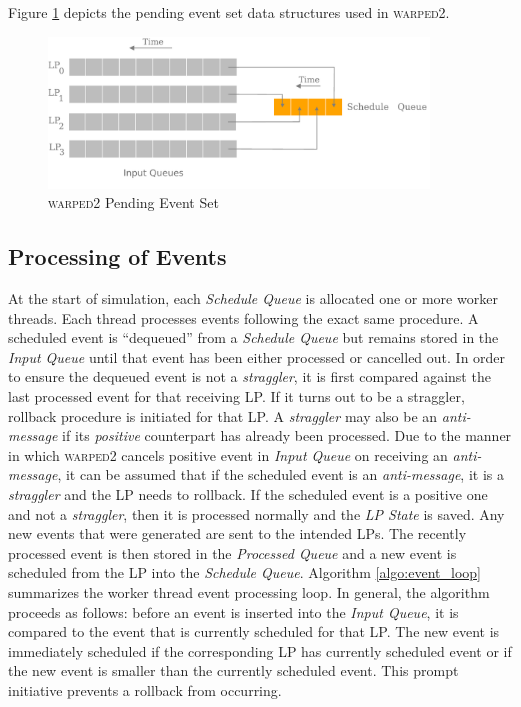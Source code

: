 \documentclass[11pt]{book}
\begin{document}
\noindent
Figure \ref{fig:timewarp_pending_event_set} depicts the pending event set data structures used in
\textsc{warped2}.

\begin{figure}
    \centering
    \includegraphics[width=0.9\textwidth]{figures/timewarp_pending_event_set.pdf}
    \caption{\textsc{warped2} Pending Event Set}\label{fig:timewarp_pending_event_set}
\end{figure}

\subsection{Processing of Events}\label{subsec:event_processing}

At the start of simulation, each \emph{Schedule Queue} is allocated one or more worker threads.  Each thread
processes events following the exact same procedure.  A scheduled event is ``dequeued'' from a \emph{Schedule
  Queue} but remains stored in the \emph{Input Queue} until that event has been either processed or cancelled
out.  In order to ensure the dequeued event is not a \emph{straggler}, it is first compared against the last
processed event for that receiving LP.  If it turns out to be a straggler, rollback procedure is initiated for
that LP.  A \emph{straggler} may also be an \emph{anti-message} if its \emph{positive} counterpart has already
been processed.  Due to the manner in which \textsc{warped2} cancels positive event in \emph{Input Queue} on
receiving an \emph{anti-message}, it can be assumed that if the scheduled event is an \emph{anti-message}, it
is a \emph{straggler} and the LP needs to rollback.  If the scheduled event is a positive one and not a
\emph{straggler}, then it is processed normally and the \emph{LP State} is saved.  Any new events that were
generated are sent to the intended LPs.  The recently processed event is then stored in the \emph{Processed
  Queue} and a new event is scheduled from the LP into the \emph{Schedule Queue}.  Algorithm
\ref{algo:event_loop} summarizes the worker thread event processing loop.  In general, the algorithm proceeds
as follows: before an event is inserted into the \emph{Input Queue}, it is compared to the event that is
currently scheduled for that LP.  The new event is immediately scheduled if the corresponding LP has currently
scheduled event or if the new event is smaller than the currently scheduled event.  This prompt initiative
prevents a rollback from occurring.
\end{document}
